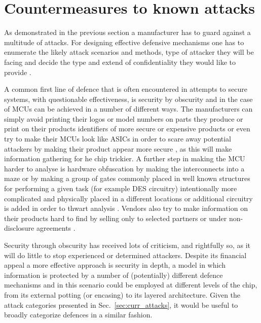 \section{Countermeasures to known attacks}
\label{sec:defences}

As demonstrated in the previous section a manufacturer has to guard against a multitude of attacks. For designing effective defensive mechanisms one has to enumerate the likely attack scenarios and methods, type of attacker they will be facing and decide the type and extend of confidentiality they would like to provide \citep{sergei:thesis} \citep{kocher:DPA}.

A common first line of defence that is often encountered in attempts to secure systems, with questionable effectiveness, is security by obscurity and in the case of MCUs can be achieved in a number of different ways. The manufacturers can simply avoid printing their logos or model numbers on parts they produce or print on their products identifiers of more secure or expensive products or even try to make their MCUs look like ASICs in order to scare away potential attackers by making their product appear more secure \citep{sergei:thesis} \citep{hwre}, as this will make information gathering for he chip trickier. A further step in making the MCU harder to analyse is hardware obfuscation by making the interconnects into a maze \citep{hwre} or by making a group of gates commonly placed in well known structures for performing a given task (for example DES circuitry) intentionally more complicated and physically placed in a different locations or additional circuitry is added in order to thwart analysis \citep{anderson:cautionary_note}. Vendors also try to make information on their products hard to find by selling only to selected partners or under non-disclosure agreements \citep{sergei:thesis}.

Security through obscurity has received lots of criticism, and rightfully so, as it will do little to stop experienced or determined attackers. Despite its financial appeal a more effective approach is security in depth, a model in which information is protected by a number of (potentially) different defence mechanisms and in this scenario could be employed at different levels of the chip, from its external potting (or encasing) to its layered architecture. Given the attack categories presented in Sec.~\ref{sec:curr_attacks}, it would be useful to broadly categorize defences in a similar fashion.

